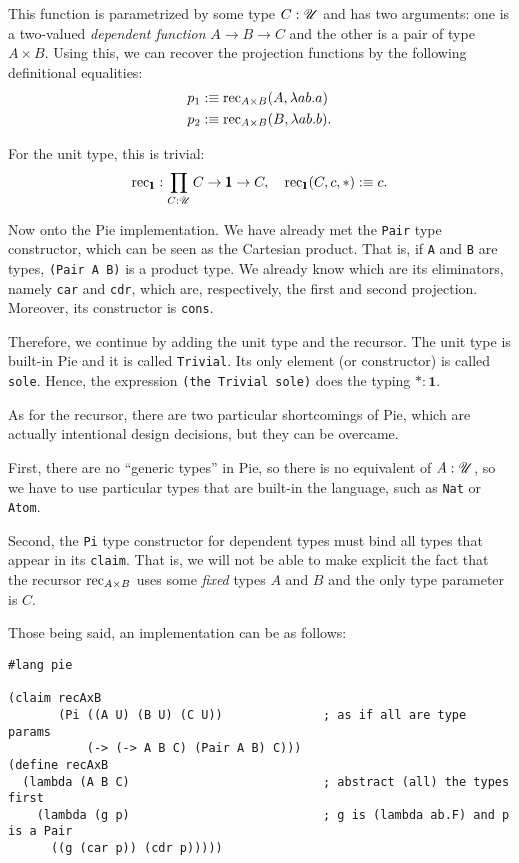 This function is parametrized by some type $ C : \mathscr{U} $ and has two arguments:
one is a two-valued \emph{dependent function} $ A \to B \to C $ and the other
is a pair of type $ A \times B $. Using this, we can recover the projection
functions by the following definitional equalities:
\begin{align*}
  p_1 &:\equiv \mathrm{rec}_{A \times B}(A, \lambda ab . a) \\
  p_2 &:\equiv \mathrm{rec}_{A \times B}(B, \lambda ab . b).
\end{align*}

For the unit type, this is trivial:
\[
  \dr{rec}_{\pmb{1}} : \prod_{C : \kal{U}} C \to \pmb{1} \to C, \quad %
  \dr{rec}_{\pmb{1}}(C, c, \ast) :\equiv c.
\]

\vspace{0.3cm}

Now onto the Pie implementation. We have already met the \texttt{Pair} type
constructor, which can be seen as the Cartesian product. That is, if
\texttt{A} and \texttt{B} are types, \texttt{(Pair A B)} is a product
type. We already know which are its eliminators, namely \texttt{car} and
\texttt{cdr}, which are, respectively, the first and second projection.
Moreover, its constructor is \texttt{cons}.

Therefore, we continue by adding the unit type and the recursor.
The unit type is built-in Pie and it is called \texttt{Trivial}. Its
only element (or constructor) is called \texttt{sole}. Hence, the
expression \texttt{(the Trivial sole)} does the typing $ \ast : \pmb{1} $.

As for the recursor, there are two particular shortcomings of Pie, which are
actually intentional design decisions\footnotemark, but they can be overcame.

First, there are no ``generic types'' in Pie, so there is no equivalent of
$ A : \mathscr{U} $, so we have to use particular types that are built-in the
language, such as \texttt{Nat} or \texttt{Atom}.

Second, the \texttt{Pi} type constructor for dependent types must bind
all types that appear in its \texttt{claim}. That is, we will not be able
to make explicit the fact that the recursor $ \mathrm{rec}_{A \times B} $ uses
some \emph{fixed} types $ A $ and $ B $ and the only type parameter is
$ C $.

Those being said, an implementation can be as follows:
{
  \small
\begin{verbatim}
#lang pie

(claim recAxB
       (Pi ((A U) (B U) (C U))              ; as if all are type params
           (-> (-> A B C) (Pair A B) C)))
(define recAxB
  (lambda (A B C)                           ; abstract (all) the types first
    (lambda (g p)                           ; g is (lambda ab.F) and p is a Pair
      ((g (car p)) (cdr p)))))
\end{verbatim}
}

